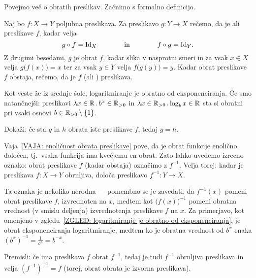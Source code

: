 		Povejmo več o obratih preslikav. Začnimo s formalno definicijo.
		
		\begin{definicija}
			Naj bo $f\colon X \to Y$ poljubna preslikava. Za preslikavo $g\colon Y \to X$ rečemo, da je  ali  preslikave $f$, kadar velja
			\[g \circ f = \id[X] \qquad\qquad \text{in} \qquad\qquad f \circ g = \id[Y].\]
			Z drugimi besedami, $g$ je obrat $f$, kadar slika v nasprotni smeri in za vsak $x \in X$ velja $g\big(f(x)\big) = x$ ter za vsak $y \in Y$ velja $f\big(g(y)\big) = y$. Kadar obrat preslikave $f$ obstaja, rečemo, da je $f$  (ali ) preslikava.
		\end{definicija}
		
		\begin{zgled}\label{ZGLED: logaritmiranje je obratno od eksponenciranja}
			Kot veste že iz srednje šole, logaritmiranje je obratno od eksponenciranja. Če smo natančnejši: preslikavi $\xlam{x}[\RR]{b^x}[\RR_{> 0}]$ in $\xlam{x}[\RR_{>0}]{\log_b x}[\RR]$ sta si obratni pri vsaki osnovi $b \in \RR_{> 0} \setminus \set{1}$.
		\end{zgled}
		
		\begin{vaja}\label{VAJA: enoličnost obrata preslikave}
			Dokaži: če sta $g$ in $h$ obrata iste preslikave $f$, tedaj $g = h$.
		\end{vaja}
		
		Vaja~\ref{VAJA: enoličnost obrata preslikave} pove, da je obrat funkcije enolično določen, tj.~vsaka funkcija ima kvečjemu en obrat. Zato lahko uvedemo izrecno oznako: obrat preslikave $f$ (kadar obstaja) označimo z $f^{-1}$. Velja torej: kadar je preslikava $f\colon X \to Y$ obrnljiva, določa preslikavo $f^{-1}\colon Y \to X$.
		
		Ta oznaka je nekoliko nerodna --- pomembno se je zavedati, da $f^{-1}(x)$ pomeni obrat preslikave $f$, izvrednoten na $x$, medtem kot $\big(f(x)\big)^{-1}$ pomeni obratna vrednost (v smislu deljenja) izvrednotenja preslikave $f$ na $x$. Za primerjavo, kot omenjeno v zgledu~\ref{ZGLED: logaritmiranje je obratno od eksponenciranja}, je obrat eksponenciranja logaritmiranje, medtem ko je obratna vrednost od $b^x$ enaka $(b^x)^{-1} = \frac{1}{b^x} = b^{-x}$.
		
		\begin{vaja}
			Premisli: če ima preslikava $f$ obrat $f^{-1}$, tedaj je tudi $f^{-1}$ obrnljiva preslikava in velja $(f^{-1})^{-1} = f$ (torej, obrat obrata je izvorna preslikava).
		\end{vaja}
		
